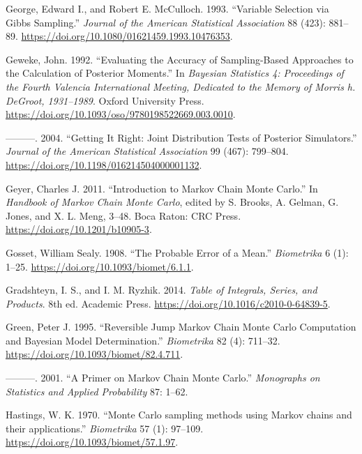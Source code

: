 \documentclass[
  11pt,
  letterpaper,
]{scrbook}
\newlength{\cslhangindent}
\newenvironment{CSLReferences}[2] %
 {\begin{list}{}{%
  \setlength{\itemindent}{0pt}
  \setlength{\leftmargin}{0pt}
  \setlength{\parsep}{0pt}
  \ifodd #1
   \setlength{\leftmargin}{\cslhangindent}
   \setlength{\itemindent}{-1\cslhangindent}
  \fi
  \setlength{\itemsep}{#2\baselineskip}}}
 {\end{list}}
\theoremstyle{definition}
\theoremstyle{definition}
\theoremstyle{definition}
\theoremstyle{plain}
\theoremstyle{plain}
\theoremstyle{plain}
\theoremstyle{remark}
\begin{document}
\begin{CSLReferences}{1}{0}
George, Edward I., and Robert E. McCulloch. 1993. {``Variable Selection
via {G}ibbs Sampling.''} \emph{Journal of the American Statistical
Association} 88 (423): 881--89.
\url{https://doi.org/10.1080/01621459.1993.10476353}.

Geweke, John. 1992. {``Evaluating the Accuracy of Sampling-Based
Approaches to the Calculation of Posterior Moments.''} In \emph{Bayesian
Statistics 4: Proceedings of the Fourth Valencia International Meeting,
Dedicated to the Memory of Morris h. DeGroot, 1931--1989}. Oxford
University Press.
\url{https://doi.org/10.1093/oso/9780198522669.003.0010}.

---------. 2004. {``Getting It Right: Joint Distribution Tests of
Posterior Simulators.''} \emph{Journal of the American Statistical
Association} 99 (467): 799--804.
\url{https://doi.org/10.1198/016214504000001132}.

Geyer, Charles J. 2011. {``Introduction to {M}arkov Chain {M}onte
{C}arlo.''} In \emph{Handbook of {M}arkov Chain {M}onte {C}arlo}, edited
by S. Brooks, A. Gelman, G. Jones, and X. L. Meng, 3--48. Boca Raton:
CRC Press. \url{https://doi.org/10.1201/b10905-3}.

Gosset, William Sealy. 1908. {``The Probable Error of a Mean.''}
\emph{Biometrika} 6 (1): 1--25.
\url{https://doi.org/10.1093/biomet/6.1.1}.

Gradshteyn, I. S., and I. M. Ryzhik. 2014. \emph{Table of Integrals,
Series, and Products}. 8th ed. Academic Press.
\url{https://doi.org/10.1016/c2010-0-64839-5}.

Green, Peter J. 1995. {``Reversible Jump {M}arkov Chain {M}onte {C}arlo
Computation and {B}ayesian Model Determination.''} \emph{Biometrika} 82
(4): 711--32. \url{https://doi.org/10.1093/biomet/82.4.711}.

---------. 2001. {``A Primer on {M}arkov Chain {M}onte {C}arlo.''}
\emph{Monographs on Statistics and Applied Probability} 87: 1--62.

Hastings, W. K. 1970. {``{Monte {C}arlo sampling methods using {M}arkov
chains and their applications}.''} \emph{Biometrika} 57 (1): 97--109.
\url{https://doi.org/10.1093/biomet/57.1.97}.


\end{CSLReferences}
\end{document}
